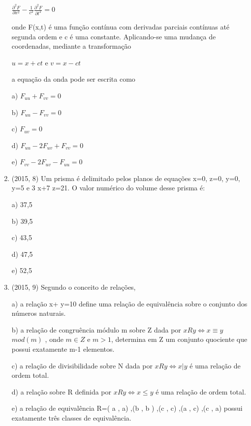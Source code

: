 \documentclass{article}
\begin{document}
\begin{enumerate}
$\frac{\partial^2 F}{\partial x^2} - \frac{1}{c^2}\frac{\partial^2 F}{\partial t^2} =0$\newline

onde F(x,t) é uma função contínua com derivadas parciais contínuas até segunda ordem e c é uma constante.
Aplicando-se uma mudança de coordenadas, mediante a transformação\newline

$u=x+ct$ e $v=x-ct$\newline

a equação da onda pode ser escrita como\newline

a) $F_{uu} + F_{vv} =0$

b) $F_{uu} - F_{vv} =0$

c) $F_{uv} =0$

d) $F_{uu} -2 F_{uv} + F_{vv} =0$

e) $F_{vv} -2 F_{uv} - F_{uu} =0$\newline




\item (2015, 8) Um prisma é delimitado pelos planos de equações x=0, z=0, y=0, y=5 e 3 x+7 z=21.
O valor numérico do volume desse prisma é:\newline


a) 37,5

b) 39,5

c) 43,5

d) 47,5

e) 52,5\newline




\item (2015, 9) Segundo o conceito de relações,\newline

a) a relação x+ y=10 define uma relação de equivalência sobre o conjunto dos números naturais.

b) a relação de congruência módulo m sobre Z dada por $x R y \Leftrightarrow x \equiv y$ $mod ( m)$ , onde $m\in Z$ e $m  > 1$, determina em Z um conjunto quociente que possui exatamente m-1 elementos.

c) a relação de divisibilidade sobre N dada por $x R y \Leftrightarrow x|y$ é uma relação de ordem total.

d) a relação sobre R definida por $xRy \Leftrightarrow x \leq y$ é uma relação de ordem total.

e) a relação de equivalência R={( a , a) ,(b , b ) ,(c , c) ,(a , c) ,(c , a)} possui exatamente três classes de equivalência.\newline




\end{enumerate}
\end{document}
